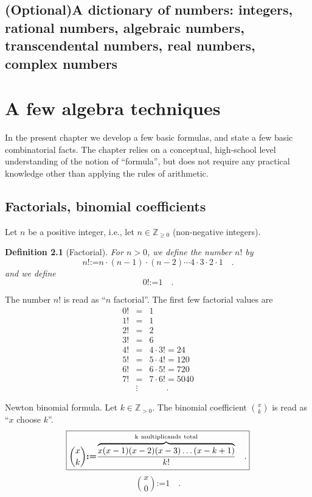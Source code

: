 \documentclass[12pt]{book}
\newcommand{\eqdef}{\textbf{:=}}
\newtheorem{definition}[theorem]{Definition}
\newcommand{\optionalMaterial}{\textbf{(Optional)}}
\begin{document}
\section[\optionalMaterial A dictionary of numbers]{\optionalMaterial A dictionary of numbers: integers, rational numbers, algebraic numbers, transcendental numbers, real numbers, complex numbers}
\chapter{A few algebra techniques}
In the present chapter we develop a few basic formulas, and state a few basic combinatorial facts. The chapter relies on a conceptual, high-school level understanding of the notion of ``formula'', but does not require any practical knowledge other than applying the rules of arithmetic.
\section{Factorials, binomial coefficients}\label{secFactorial}
Let $n$ be a positive integer, i.e., let $n \in \mathbb Z_{\geq 0}$ (non-negative integers).
\begin{definition}[Factorial] 
For $n>0$, we define the number $n!$ by
\[
n!\eqdef n\cdot(n-1)\cdot(n-2)\cdots 4\cdot 3\cdot 2 \cdot 1 \quad  .
\]
and we define
\[
0!\eqdef 1\quad .
\]
\end{definition}
The number $n!$ is read as ``$n$ factorial''. The first few factorial values are
\[\begin{array}{rcl}
0!&=&1\\
1!&=&1\\
2!&=&2\\
3!&=&6\\
4!&=&4\cdot 3!=24\\
5!&=&5\cdot 4!=120\\
6!&=&6\cdot 5!=720\\
7!&=&7\cdot 6!=5040  \\
&\vdots&\quad \quad .
\end{array}
\]

 Newton binomial formula.
 Let $k\in \mathbb Z_{>0}$. The binomial coefficient $\binom{x}{k}$ is read as ``$x$ choose $k$''.
\begin{equation}\boxed{
\label{eqBinomialCoeffDefinition}
\binom{x}{k}\eqdef \frac{ \overbrace{ x(x-1)(x-2)(x-3)\dots (x-k+1)}^{\mathrm{k~multiplicands~total}} } {k!} \quad .
}
\end{equation}
\[\binom{x}{0}\eqdef 1 \quad .
\]
\end{document}
